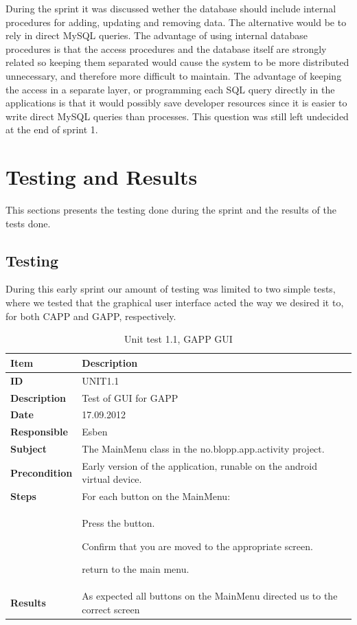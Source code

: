 During the sprint it was discussed wether the database should include internal procedures
for adding, updating and removing data. The alternative would be to rely in direct MySQL
queries. The advantage of using internal database procedures is that the access procedures
and the database itself are strongly related so keeping them separated would cause 
the system to be more distributed unnecessary, and therefore more difficult to maintain. 
The advantage of keeping the access in a separate layer, or programming each SQL query 
directly in the applications is that it would possibly save developer resources since it
is easier to write direct MySQL queries than processes. This question was still left
undecided at the end of sprint 1.

\section{Testing and Results}
\label{sec:sprint1testingAndResults}
This sections presents the testing done during the sprint and the results of the tests done.

\subsection{Testing}
During this early sprint our amount of testing was limited to two simple tests, where we tested
that the graphical user interface acted the way we desired it to, for both CAPP
and GAPP, respectively.

\begin{table}
	\begin{center}
		\begin{tabular}{|p{3.0cm}|p{14.0cm}|}
			\hline
			\bf{Item} & \bf{Description}\\
			\hline
			\bf{ID} & UNIT1.1\\
			\bf{Description} & Test of GUI for GAPP\\
			\bf{Date} & 17.09.2012\\
			\bf{Responsible} & Esben\\
			\bf{Subject} & The MainMenu class in the no.blopp.app.activity project.\\
			\bf{Precondition} & Early version of the application, runable on the android virtual device.\\
			\bf{Steps} & For each button on the MainMenu:\\
			\bf{} &
			\begin{tabulenum}
			\item Press the button.
			\item Confirm that you are moved to the appropriate screen.
			\item return to the main menu.
			\end{tabulenum}\\
			\hline
			\bf{Results} & As expected all buttons on the MainMenu directed us to the correct screen\\
			\hline
		\end{tabular}
	\end{center}
	\caption{Unit test 1.1, GAPP GUI}
	\label{tab:unit1.1}
\end{table}

